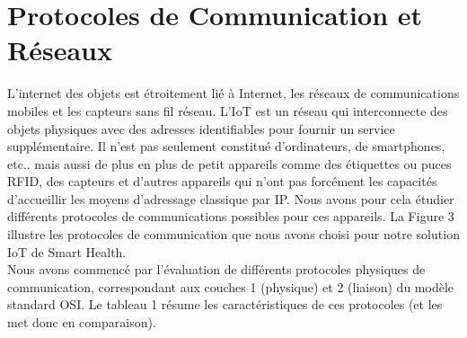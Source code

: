 \documentclass{article}
\begin{document}



\section {Protocoles de Communication et Réseaux}

L’internet des objets est étroitement lié à Internet, les réseaux de communications mobiles et les capteurs sans fil réseau. L’IoT est un réseau qui interconnecte des objets physiques avec des adresses identifiables pour fournir un service supplémentaire. Il n’est pas seulement constitué d’ordinateurs, de smartphones, etc.. mais aussi de plus en plus de petit appareils comme des étiquettes ou puces RFID, des capteurs et d’autres appareils qui n’ont pas forcément les capacités d’accueillir les moyens d’adressage classique par IP. Nous avons pour cela étudier différents protocoles de communications possibles pour ces appareils. La Figure 3 illustre les protocoles de communication que nous avons choisi pour notre solution IoT de Smart Health.
\\

Nous avons commencé par l’évaluation de différents protocoles physiques de communication, correspondant aux couches 1 (physique) et 2 (liaison) du modèle standard OSI. Le tableau 1 résume les caractéristiques de ces protocoles (et les met donc en comparaison).
\end{document}
